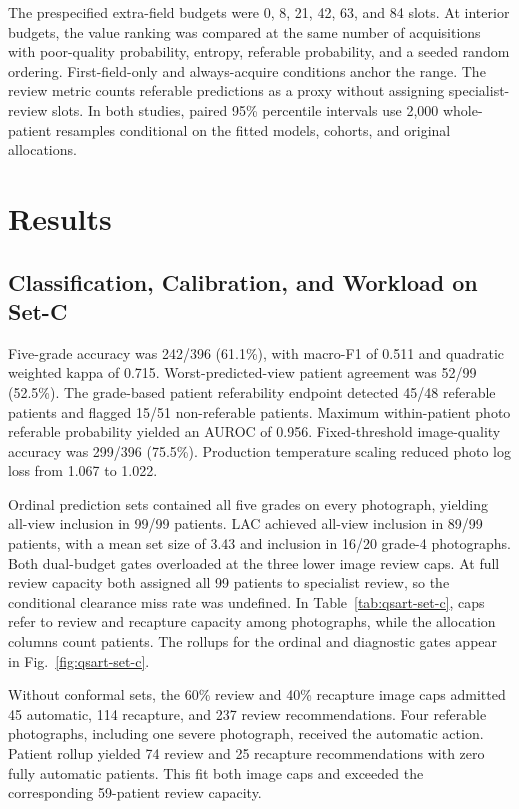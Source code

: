 \documentclass[conference]{IEEEtran}
\begin{document}
The prespecified extra-field budgets were 0, 8, 21, 42, 63, and 84 slots. At
interior budgets, the value ranking was compared at the same number of
acquisitions with poor-quality probability, entropy, referable probability,
and a seeded random ordering. First-field-only and always-acquire conditions
anchor the range. The review metric counts referable predictions as a proxy
without assigning specialist-review slots. In both studies, paired 95\%
percentile intervals use 2,000 whole-patient resamples conditional on the
fitted models, cohorts, and original allocations.

\section{Results}


\subsection{Classification, Calibration, and Workload on Set-C}
Five-grade accuracy was 242/396 (61.1\%), with macro-F1 of 0.511 and quadratic
weighted kappa of 0.715. Worst-predicted-view
patient agreement was 52/99 (52.5\%). The grade-based patient referability
endpoint detected 45/48 referable patients and flagged 15/51 non-referable
patients. Maximum within-patient photo referable probability yielded an AUROC
of 0.956. Fixed-threshold image-quality accuracy was 299/396 (75.5\%).
Production temperature scaling reduced photo log loss from 1.067 to 1.022.

Ordinal prediction sets contained all five grades on every photograph,
yielding all-view inclusion in 99/99 patients. LAC achieved all-view inclusion
in 89/99 patients, with a mean set size of 3.43 and inclusion in 16/20 grade-4
photographs. Both dual-budget gates overloaded at the three lower image review
caps. At full review capacity both assigned all 99 patients to specialist
review, so the conditional clearance miss rate was undefined.
In Table~\ref{tab:qsart-set-c}, caps refer to review and recapture capacity
among photographs, while the allocation columns count patients. The rollups
for the ordinal and diagnostic gates appear in Fig.~\ref{fig:qsart-set-c}.

Without conformal sets, the 60\% review and 40\% recapture image caps admitted
45 automatic, 114 recapture, and 237 review recommendations. Four referable
photographs, including one severe photograph, received the automatic action.
Patient rollup yielded 74 review and 25 recapture recommendations with zero
fully automatic patients. This fit both image caps and exceeded the
corresponding 59-patient review capacity.
\end{document}
